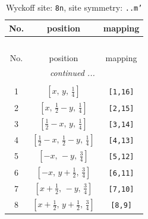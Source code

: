 \documentclass[fleqn,8pt]{jsarticle}
\begin{document}
\begin{longtable}{ccc}
\caption{Wyckoff site: {\tt 8n}, site symmetry: {\tt ..m'}}
 \\
 \hline \hline
No. & position & mapping \\ \hline \endfirsthead

\multicolumn{2}{l}{\tablename\ \thetable{}} \\
 \hline \hline
No. & position & mapping \\ \hline \endhead

 \hline \hline
\multicolumn{2}{r}{\footnotesize\it continued ...} \\ \endfoot

 \hline \hline
\multicolumn{2}{r}{} \\ \endlastfoot

1 & $\left[ x,\, y,\, \frac{1}{4} \right]$ & {\tt [1,16]} \\ \hline
2 & $\left[ x,\, \frac{1}{2} - y,\, \frac{1}{4} \right]$ & {\tt [2,15]} \\ \hline
3 & $\left[ \frac{1}{2} - x,\, y,\, \frac{1}{4} \right]$ & {\tt [3,14]} \\ \hline
4 & $\left[ \frac{1}{2} - x,\, \frac{1}{2} - y,\, \frac{1}{4} \right]$ & {\tt [4,13]} \\ \hline
5 & $\left[ - x,\, - y,\, \frac{3}{4} \right]$ & {\tt [5,12]} \\ \hline
6 & $\left[ - x,\, y + \frac{1}{2},\, \frac{3}{4} \right]$ & {\tt [6,11]} \\ \hline
7 & $\left[ x + \frac{1}{2},\, - y,\, \frac{3}{4} \right]$ & {\tt [7,10]} \\ \hline
8 & $\left[ x + \frac{1}{2},\, y + \frac{1}{2},\, \frac{3}{4} \right]$ & {\tt [8,9]} \\
\end{longtable}
\renewcommand{\arraystretch}{1.2}
\end{document}
